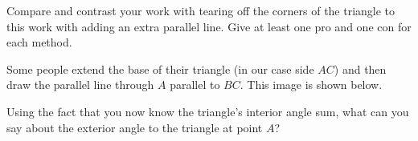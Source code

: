 \documentclass[nooutcomes,noauthor]{ximera}
\begin{document}
\begin{problem}
Compare and contrast your work with tearing off the corners of the triangle to this work with adding an extra parallel line. Give at least one pro and one con for each method.
\end{problem}


\begin{problem}
Some people extend the base of their triangle (in our case side $AC$) and then draw the parallel line through $A$ parallel to $BC$. This image is shown below. 
\begin{image}
\end{image}

Using the fact that you now know the triangle's interior angle sum, what can you say about the exterior angle to the triangle at point $A$?
\end{problem}


\newpage
\end{document}
